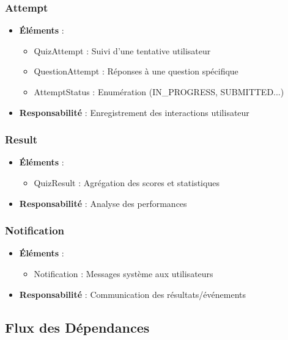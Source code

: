 \documentclass[12pt,a4paper]{report}
\begin{document}
\subsubsection{Attempt}
\begin{itemize}
\item \textbf{Éléments} :
  \begin{itemize}
  \item QuizAttempt : Suivi d'une tentative utilisateur
  \item QuestionAttempt : Réponses à une question spécifique
  \item AttemptStatus : Enumération (IN\_PROGRESS, SUBMITTED...)
  \end{itemize}
\item \textbf{Responsabilité} : Enregistrement des interactions utilisateur
\end{itemize}

\subsubsection{Result}
\begin{itemize}
\item \textbf{Éléments} :
  \begin{itemize}
  \item QuizResult : Agrégation des scores et statistiques
  \end{itemize}
\item \textbf{Responsabilité} : Analyse des performances
\end{itemize}

\subsubsection{Notification}
\begin{itemize}
\item \textbf{Éléments} :
  \begin{itemize}
  \item Notification : Messages système aux utilisateurs
  \end{itemize}
\item \textbf{Responsabilité} : Communication des résultats/événements
\end{itemize}

\subsection{Flux des Dépendances}
\end{document}
